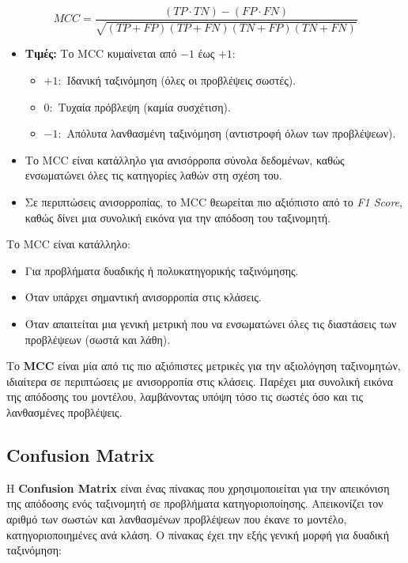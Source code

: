 \documentclass[diploma]{softlab-thesis}
\begin{document}
\[
MCC = \frac{(TP \cdot TN) - (FP \cdot FN)}{\sqrt{(TP + FP)(TP + FN)(TN + FP)(TN + FN)}}
\]

\begin{itemize}
    \item \textbf{Τιμές:}
    Το MCC κυμαίνεται από \(-1\) έως \(+1\):
    \begin{itemize}
        \item \(+1:\) Ιδανική ταξινόμηση (όλες οι προβλέψεις σωστές).
        \item \(0:\) Τυχαία πρόβλεψη (καμία συσχέτιση).
        \item \(-1:\) Απόλυτα λανθασμένη ταξινόμηση (αντιστροφή όλων των προβλέψεων).
    \end{itemize}
    
\item Το MCC είναι κατάλληλο για ανισόρροπα σύνολα δεδομένων, καθώς ενσωματώνει όλες τις κατηγορίες λαθών στη σχέση του.

\item  Σε περιπτώσεις ανισορροπίας, το MCC θεωρείται πιο αξιόπιστο από το \textit{F1 Score}, καθώς δίνει μια συνολική εικόνα για την απόδοση του ταξινομητή.
\end{itemize}

Το MCC είναι κατάλληλο:
\begin{itemize}
    \item Για προβλήματα δυαδικής ή πολυκατηγορικής ταξινόμησης.
    \item Όταν υπάρχει σημαντική ανισορροπία στις κλάσεις.
    \item Όταν απαιτείται μια γενική μετρική που να ενσωματώνει όλες τις διαστάσεις των προβλέψεων (σωστά και λάθη).
\end{itemize}

Το \textbf{MCC} είναι μία από τις πιο αξιόπιστες μετρικές για την αξιολόγηση ταξινομητών, ιδιαίτερα σε περιπτώσεις με ανισορροπία στις κλάσεις. Παρέχει μια συνολική εικόνα της απόδοσης του μοντέλου, λαμβάνοντας υπόψη τόσο τις σωστές όσο και τις λανθασμένες προβλέψεις.


\subsection{Confusion Matrix}

Η \textbf{Confusion Matrix} είναι ένας πίνακας που χρησιμοποιείται για την απεικόνιση της απόδοσης ενός ταξινομητή σε προβλήματα κατηγοριοποίησης. Απεικονίζει τον αριθμό των σωστών και λανθασμένων προβλέψεων που έκανε το μοντέλο, κατηγοριοποιημένες ανά κλάση. Ο πίνακας έχει την εξής γενική μορφή για δυαδική ταξινόμηση:
\end{document}
